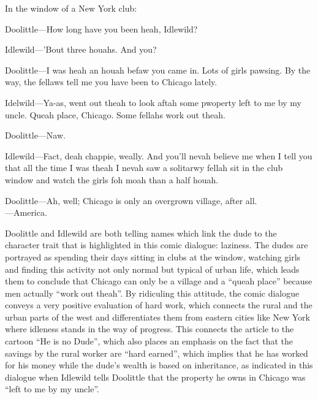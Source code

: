 \begin{ipquote}
\begin{center}
\end{center}
In the window of a New York club:

Doolittle—How long have you been heah, Idlewild?

Idlewild—’Bout three houahs. And you?

Doolittle—I was heah an houah befaw you came in. Lots of girls pawsing. By the way, the fellaws tell me you have been to Chicago lately.

Idelwild—Ya-as, went out theah to look aftah some pwoperty left to me by my uncle. Queah place, Chicago. Some fellahs work out theah.

Doolittle—Naw.

Idlewild—Fact, deah chappie, weally. And you’ll nevah believe me when I tell you that all the time I was theah I nevah saw a solitarwy fellah sit in the club window and watch the girls foh moah than a half houah.

Doolittle—Ah, well; Chicago is only an overgrown village, after all.\\ —America.
\end{ipquote}


Doolittle and Idlewild are both telling names which link the dude to the character trait that is highlighted in this comic dialogue: laziness. The dudes are portrayed as spending their days sitting in clubs at the window, watching girls and finding this activity not only normal but typical of urban life, which leads them to conclude that Chicago can only be a village and a “queah place” because men actually “work out theah”. By ridiculing this attitude, the comic dialogue conveys a very positive evaluation of hard work, which connects the rural and the urban parts of the west and differentiates them from eastern cities like New York where idleness stands in the way of progress. This connects the article to the cartoon “He is no Dude”, which also places an emphasis on the fact that the savings by the rural worker are “hard earned”, which implies that he has worked for his money while the dude’s wealth is based on inheritance, as indicated in this dialogue when Idlewild tells Doolittle that the property he owns in Chicago was “left to me by my uncle”.


